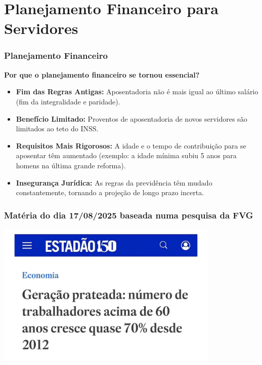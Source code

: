 \section{Planejamento Financeiro para Servidores}

\begin{frame}[c]\frametitle{Planejamento Financeiro}
  \textbf{Por que o planejamento financeiro se tornou essencial?}
  \begin{itemize}
    \item \textbf{Fim das Regras Antigas:} Aposentadoria não é mais igual ao último salário (fim da integralidade e paridade).
    \item \textbf{Benefício Limitado:} Proventos de aposentadoria de novos servidores são limitados ao teto do INSS.
    \item \textbf{Requisitos Mais Rigorosos:} A idade e o tempo de contribuição para se aposentar têm aumentado (exemplo: a idade mínima subiu 5 anos para homens na última grande reforma).
    \item \textbf{Insegurança Jurídica:} As regras da previdência têm mudado constantemente, tornando a projeção de longo prazo incerta.
  \end{itemize}
\end{frame}

\begin{frame}[t]\frametitle{Matéria do dia 17/08/2025 baseada numa pesquisa da FVG}

  \begin{center}
    \includegraphics[width=0.8\textwidth]{figuras/geracao_prateada.jpeg}
  \end{center}

\end{frame}

